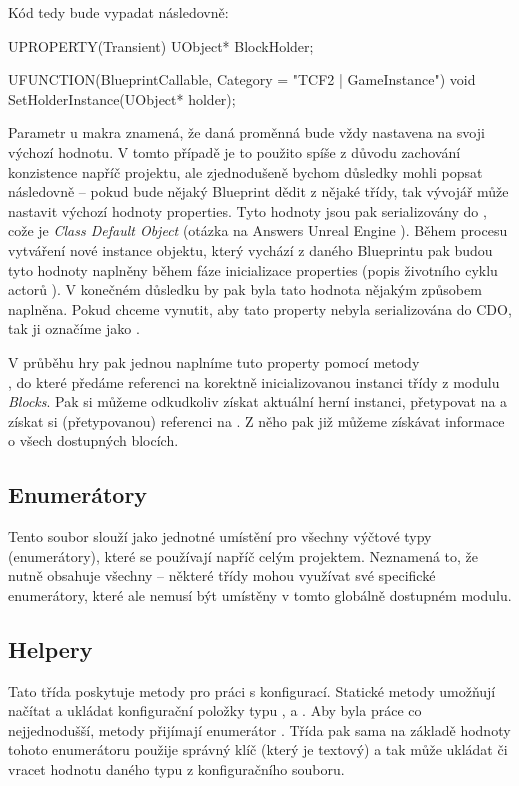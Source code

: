 Kód tedy bude vypadat následovně:
\begin{code}
	UPROPERTY(Transient)
		UObject* BlockHolder;

	UFUNCTION(BlueprintCallable, Category = "TCF2 | GameInstance")
		void SetHolderInstance(UObject* holder);
\end{code}
 Parametr  u makra  znamená, že daná proměnná bude vždy nastavena na svoji výchozí hodnotu. V tomto případě je to použito spíše z důvodu zachování konzistence napříč projektu, ale zjednodušeně bychom důsledky mohli popsat následovně -- pokud bude nějaký Blueprint dědit z nějaké \CPP{} třídy, tak vývojář může nastavit výchozí hodnoty properties. Tyto hodnoty jsou pak serializovány do \CDO{}, cože je \textit{Class Default Object} (otázka na Answers Unreal Engine \citep{ue_cdo}). Během procesu vytváření nové instance objektu, který vychází z daného Blueprintu pak budou tyto hodnoty naplněny během fáze inicializace properties (popis životního cyklu actorů \citep{ue_actor_life}). V konečném důsledku by pak byla tato hodnota nějakým způsobem naplněna. Pokud chceme vynutit, aby tato property nebyla serializována do CDO, tak ji označíme jako .

V průběhu hry pak jednou naplníme tuto property pomocí metody\\ , do které předáme referenci na korektně inicializovanou instanci třídy  z modulu \textit{Blocks}. Pak si můžeme odkudkoliv získat aktuální herní instanci, přetypovat na  a získat si (přetypovanou) referenci na . Z něho pak již můžeme získávat informace o všech dostupných blocích.

\subsection{Enumerátory}

Tento soubor slouží jako jednotné umístění pro všechny výčtové typy (enumerátory), které se používají napříč celým projektem. Neznamená to, že nutně obsahuje všechny -- některé třídy mohou využívat své specifické enumerátory, které ale nemusí být umístěny v tomto globálně dostupném modulu.


\subsection{Helpery}

 Tato třída poskytuje metody pro práci s konfigurací. Statické metody umožňují načítat a ukládat konfigurační položky typu ,  a .
Aby byla práce co nejjednodušší, metody přijímají enumerátor . Třída pak sama na základě hodnoty tohoto enumerátoru použije správný klíč (který je textový) a tak může ukládat či vracet hodnotu daného typu z konfiguračního souboru.